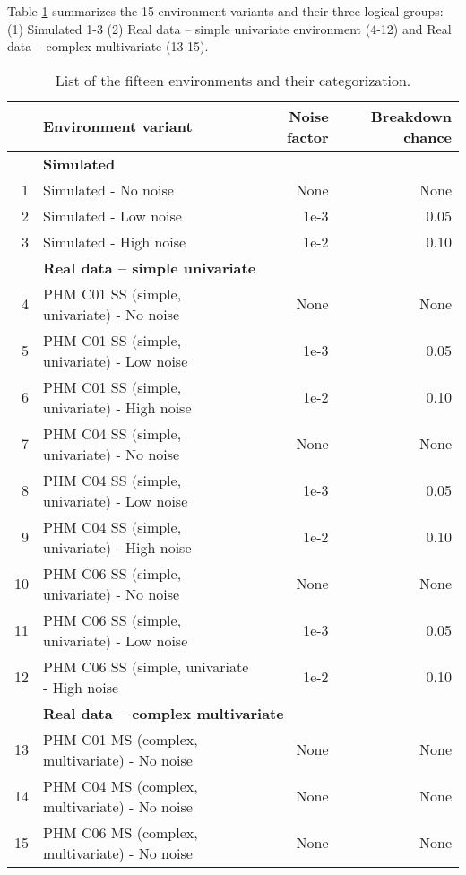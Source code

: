 \documentclass[referee, sn-mathphys-num]{sn-jnl}
\newcommand{\rowspace}[1]{\renewcommand{\arraystretch}{#1}}
\begin{document}
	Table \ref{tbl_ListEnvironments} summarizes the 15 environment variants and their three logical groups: (1) Simulated 1-3 (2) Real data -- simple univariate environment (4-12) and Real data -- complex multivariate (13-15).
	
	\begin{table}
		\rowspace{1.3}
		\caption{List of the fifteen environments and their categorization.}\label{tbl_ListEnvironments}
		{\begin{tabular}{@{}r l rr@{}} \arrayrulecolor{black!40}\toprule 
				& Environment variant & Noise factor & Breakdown chance \\ \midrule
				& \multicolumn{3}{l}{\textbf{Simulated}}\\
				1 & Simulated - No noise  & None & None \\
				2 & Simulated - Low noise & 1e-3 & 0.05 \\
				3 & Simulated  - High noise & 1e-2 & 0.10 \\ \midrule
				\rule{0pt}{1.5\normalbaselineskip}
				& \multicolumn{3}{l}{\textbf{Real data -- simple univariate}} \\
				4 & PHM C01 SS (simple, univariate) - No noise & None & None \\
				5 & PHM C01 SS (simple, univariate) - Low noise & 1e-3 & 0.05 \\
				6 & PHM C01 SS (simple, univariate) - High noise & 1e-2 & 0.10 \\ \hdashline
				
				7 & PHM C04 SS (simple, univariate) - No noise & None & None \\
				8 & PHM C04 SS (simple, univariate) - Low noise & 1e-3 & 0.05 \\
				9 & PHM C04 SS (simple, univariate) - High noise & 1e-2 & 0.10 \\ \hdashline
				
				10 & PHM C06 SS (simple, univariate) - No noise & None & None \\
				11 & PHM C06 SS (simple, univariate) - Low noise & 1e-3 & 0.05 \\
				12 & PHM C06 SS (simple, univariate - High noise & 1e-2 & 0.10 \\ \midrule
				
				\rule{0pt}{1.5\normalbaselineskip}
				& \multicolumn{3}{l}{\textbf{Real data -- complex multivariate}}\\
				13 & PHM C01 MS (complex, multivariate) - No noise & None & None \\
				14 & PHM C04 MS (complex, multivariate) - No noise & None & None \\
				15 & PHM C06 MS (complex, multivariate) - No noise & None & None \\ \bottomrule
		\end{tabular}}
		
	\end{table}
	
\end{document}
